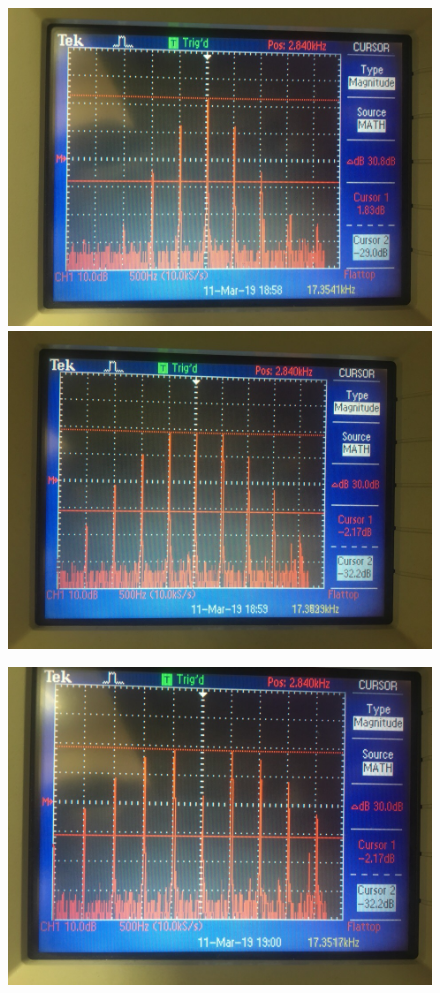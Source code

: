 \begin{figure}[H]
\begin{minipage}{0.45\linewidth}
	\includegraphics[width=\linewidth]{photo/task32(3).jpg}
\end{minipage}
\begin{minipage}{0.45\linewidth}
	\centering
	\includegraphics[width=\linewidth]{photo/task32(4).jpg}
\end{minipage}
\end{figure}
\begin{figure}
	\centering
	\includegraphics[width=0.45\linewidth]{photo/task32(5).jpg}
\end{figure}

